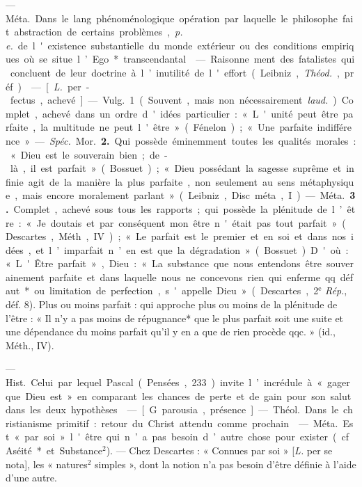 \begin{itemize}[leftmargin=1cm, label=, itemsep=1pt]
 — \si{Méta.}
Dans le lang. phénoménologique
opération par laquelle le philosophe fait abstraction de certains
problèmes, {\it p. e.} de l'existence substantielle du monde extérieur ou des
conditions empiriques où se situe
l’Ego* transcendantal.

 — Raisonne
ment des fatalistes qui concluent de
leur doctrine à l’inutilité de l'effort
(Leibniz, {\it Théod.}, préf.).

 — [{\it L.} per-fectus, achevé] — \si{Vulg.}
1. (Souvent, mais non nécessairement {\it laud.}). Complet, achevé dans
un ordre d'idées particulier : « L'unité
peut être parfaite, la multitude ne
peut l'être » (Fénelon) ; « Une parfaite indifférence ». — {\it Spéc.} \si{Mor.}
 {\bf 2.} Qui possède éminemment toutes
les qualités morales : « Dieu est le
souverain bien ; de-là, il est parfait »
(Bossuet) ; « Dieu possédant la sagesse suprême et infinie agit de la
manière la plus parfaite, non seulement au sens métaphysique, mais
encore moralement parlant » (Leibniz, Disc. méta., I).

— \si{Méta.} {\bf 3.} Complet, achevé sous
tous les rapports; qui possède la
plénitude de l’être : « Je doutais et
par conséquent mon être n'était pas
tout parfait » (Descartes, Méth., IV) ;
« Le parfait est le premier et en soi
et dans nos idées, et l’imparfait n’en
est que la dégradation » (Bossuet).
D'où : « L'Être parfait », Dieu : « La
substance que nous entendons être
souverainement parfaite et dans laquelle nous ne concevons rien qui
enferme qq. défaut* ou limitation de
perfection, s'appelle Dieu » (Descartes, 2$^\text{e}$ {\it Rép.}, déf. 8). Plus ou
moins parfait : qui approche plus ou
moins de la plénitude de l'être : « Il
n’y a pas moins de répugnance* que
le plus parfait soit une suite et une
dépendance du moins parfait qu'il
y en a que de rien procède qqc. »
(id., Méth., IV).

 — \si{Hist.} Celui
par lequel Pascal (Pensées, 233)
invite l’incrédule à « gager que Dieu
est » en comparant les chances de
perte et de gain pour son salut dans
les deux hypothèses.

 — [G. parousia, présence] —
\si{Théol.} Dans le christianisme primitif : retour du Christ attendu
comme prochain.

 — \si{Méta.} Est « par soi » l'être
qui n’a pas besoin d’autre chose
pour exister (cf. Aséité* et Substance$^2$). — Chez Descartes : « Connues par soi » [{\it L.} per se nota], les
« natures$^2$ simples », dont la notion
n’a pas besoin d’être définie à l’aide
d’une autre.


\end{itemize}
